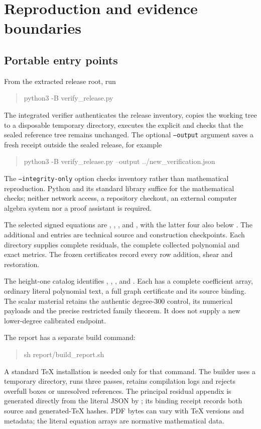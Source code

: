 \section{Reproduction and evidence boundaries}
\label{sec:verification}
\subsection{Portable entry points}
From the extracted release root, run
\begin{quote}\ttfamily
python3 -B verify\_release.py
\end{quote}
The integrated verifier authenticates the release inventory, copies the
working tree to a disposable temporary directory, executes the explicit
 and checks that the sealed reference tree remains
unchanged. The optional \texttt{--output} argument saves a fresh receipt
outside the sealed release, for example
\begin{quote}\ttfamily
python3 -B verify\_release.py --output ../new\_verification.json
\end{quote}
The \texttt{--integrity-only} option checks inventory rather than mathematical
reproduction. Python and its standard library suffice for the mathematical
checks; neither network access, a repository checkout, an external computer
algebra system nor a proof assistant is required.

The selected signed equations are ,
, ,  and
, with the latter four also below .
The additional  and  entries are technical
source and construction checkpoints. Each directory supplies complete
residuals, the complete collected polynomial and exact metrics. The frozen
certificates record every row addition, shear and restoration.

The height-one catalog identifies , ,
,  and . Each has a
complete coefficient array, ordinary literal polynomial text, a full graph
certificate and its source binding. The scalar material retains the authentic
degree-300 control, its numerical payloads and the precise restricted
family theorem. It does not supply a new lower-degree calibrated endpoint.

The report has a separate build command:
\begin{quote}\ttfamily
sh report/build\_report.sh
\end{quote}
A standard TeX installation is needed only for that command. The builder
uses a temporary directory, runs three passes, retains compilation logs and
rejects overfull boxes or unresolved references. The principal residual
appendix is generated directly from the literal JSON by
; its binding receipt records both source
and generated-TeX hashes. PDF bytes can vary with TeX versions and metadata;
the literal equation arrays are normative mathematical data.

